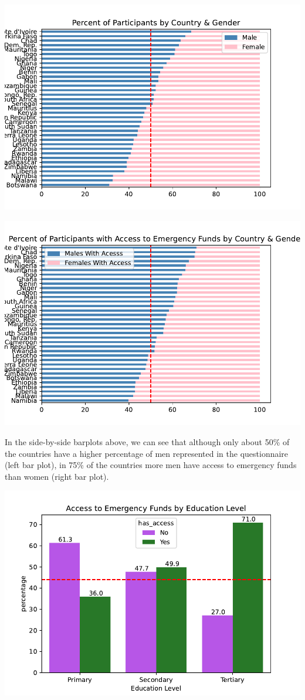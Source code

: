 \documentclass[water,article,submit,moreauthors,pdftex]{mdpi}
\begin{document}
\includegraphics{term_paper_files/figure-latex/unnamed-chunk-18-17.pdf}

\includegraphics{term_paper_files/figure-latex/unnamed-chunk-19-19.pdf}

In the side-by-side barplots above, we can see that although only about
50\% of the countries have a higher percentage of men represented in the
questionnaire (left bar plot), in 75\% of the countries more men have
access to emergency funds than women (right bar plot).

\includegraphics{term_paper_files/figure-latex/unnamed-chunk-21-21.pdf}
\end{document}
